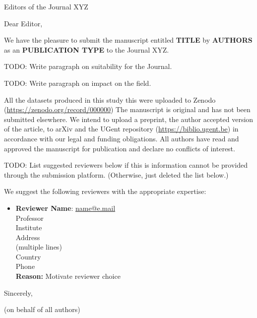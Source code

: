 \documentclass[faculty=we,rightcolwidth=.38]{ugent-letter}
\begin{document}
\mydate{\today}
\mysubject{}

\begin{letter}{
Editors of the Journal XYZ
}

\opening{Dear Editor,}

We have the pleasure to submit the manuscript entitled
\textbf{TITLE}
by \textbf{AUTHORS} as an \textbf{PUBLICATION TYPE} to the Journal XYZ.

TODO: Write paragraph on suitability for the Journal.

TODO: Write paragraph on impact on the field.

All the datasets produced in this study this were uploaded to Zenodo (\url{https://zenodo.org/record/000000}) The manuscript is original and has not been submitted elsewhere.
We intend to upload a preprint, the author accepted version of the article, to arXiv and the UGent repository (\url{https://biblio.ugent.be}) in accordance with our legal and funding obligations.
All authors have read and approved the manuscript for publication and declare no conflicts of interest.

TODO: List suggested reviewers below if this is information cannot be provided through the submission platform. (Otherwise, just deleted the list below.)

We suggest the following reviewers with the appropriate expertise:
%
\begin{itemize}[itemsep=12pt]
    \item
    \begin{minipage}[t]{\linewidth}
    \textbf{Reviewer Name}: \href{mailto:name@e.mail}{name@e.mail} \\
    Professor \\
    Institute \\
    Address \\
    (multiple lines) \\
    Country \\
    Phone \\
    \textbf{Reason:} Motivate reviewer choice
    \end{minipage}
\end{itemize}

\closing{Sincerely,}
(on behalf of all authors)

\end{letter}
\end{document}
